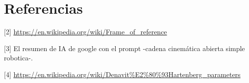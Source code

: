 \section{Referencias}
[2] \url{https://en.wikipedia.org/wiki/Frame_of_reference}

[3] El resumen de IA de google con el prompt -cadena cinemática abierta simple robotica-.

[4] \url{https://en.wikipedia.org/wiki/Denavit%E2%80%93Hartenberg_parameters}